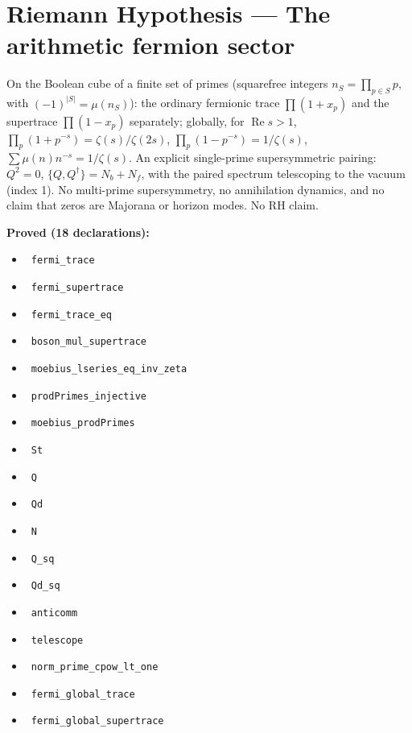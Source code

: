 \documentclass{report}
\theoremstyle{definition}
\begin{document}
\section{Riemann Hypothesis --- The arithmetic fermion sector}
On the Boolean cube of a finite set of primes (squarefree integers $n_S=\prod_{p\in S}p$, with $(-1)^{|S|}=\mu(n_S)$): the ordinary fermionic trace $\prod(1+x_p)$ and the supertrace $\prod(1-x_p)$ separately; globally, for $\operatorname{Re}s>1$, $\prod_p(1+p^{-s})=\zeta(s)/\zeta(2s)$, $\prod_p(1-p^{-s})=1/\zeta(s)$, $\sum\mu(n)n^{-s}=1/\zeta(s)$. An explicit single-prime supersymmetric pairing: $Q^2=0$, $\{Q,Q^\dagger\}=N_b+N_f$, with the paired spectrum telescoping to the vacuum (index 1). No multi-prime supersymmetry, no annihilation dynamics, and no claim that zeros are Majorana or horizon modes. No RH claim.

\noindent\textbf{Proved (18 declarations):}
\begin{itemize}
  \item {}\leanok\ \texttt{fermi\_trace}
  \item {}\leanok\ \texttt{fermi\_supertrace}
  \item {}\leanok\ \texttt{fermi\_trace\_eq}
  \item {}\leanok\ \texttt{boson\_mul\_supertrace}
  \item {}\leanok\ \texttt{moebius\_lseries\_eq\_inv\_zeta}
  \item {}\leanok\ \texttt{prodPrimes\_injective}
  \item {}\leanok\ \texttt{moebius\_prodPrimes}
  \item {}\leanok\ \texttt{St}
  \item {}\leanok\ \texttt{Q}
  \item {}\leanok\ \texttt{Qd}
  \item {}\leanok\ \texttt{N}
  \item {}\leanok\ \texttt{Q\_sq}
  \item {}\leanok\ \texttt{Qd\_sq}
  \item {}\leanok\ \texttt{anticomm}
  \item {}\leanok\ \texttt{telescope}
  \item {}\leanok\ \texttt{norm\_prime\_cpow\_lt\_one}
  \item {}\leanok\ \texttt{fermi\_global\_trace}
  \item {}\leanok\ \texttt{fermi\_global\_supertrace}
\end{itemize}
\end{document}
